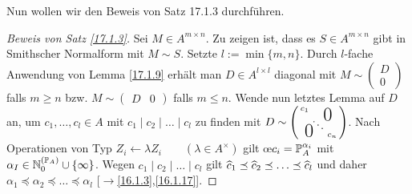 \documentclass[../../main.tex]{subfiles}
\begin{document}
\begin{bewna}\label{17.1.11}
    Nun wollen wir den Beweis von Satz 17.1.3 durchführen.
    \begin{proof}[Beweis von Satz \ref{17.1.3}]
        Sei $M\in A^{m\times n}$. Zu zeigen ist, dass es $S\in A^{m\times n}$ gibt in Smithscher Normalform mit $M\sim S$. Setzte $l:=\min\{m,n\}$. Durch $l$-fache Anwendung von Lemma \ref{17.1.9} erhält man $D\in A^{l\times l}$ diagonal mit $M\sim\begin{pmatrix}D\\0\end{pmatrix}$ falls $m\ge n$ bzw. $M\sim \begin{pmatrix}D&0\end{pmatrix}$ falls $m\le n$. Wende nun letztes Lemma auf $D$ an, um $c_1,\ldots ,c_l\in A$ mit $c_1\mid c_2\mid\ldots \mid c_l$ zu finden mit $D\sim \left(
            \begin{smallmatrix}
                c_1 & & \llap{$\overset{\blap{\LARGE 0}}{~}$} \\
                & \ddots &\\
                \rlap{\tlap{\LARGE 0}} & & c_n
            \end{smallmatrix}
        \right)$. Nach Operationen von Typ $Z_i\leftarrow \lambda Z_i\qquad (\lambda\in A^\times)$ gilt \oe $c_i=\P_A^{\alpha_i}$ mit $\alpha_I\in \expfam\cup\{\infty\}$. Wegen $c_1\mid c_2\mid\ldots \mid c_l$ gilt $\tc c_1\preceq \tc c_2\preceq\ldots \preceq \tc c_l$ und daher $\alpha_1\preceq \alpha_2\preceq\ldots \preceq \alpha_l$ [$\to$\ref{16.1.3},\ref{16.1.17}].
    \end{proof}
\end{bewna}
\end{document}
